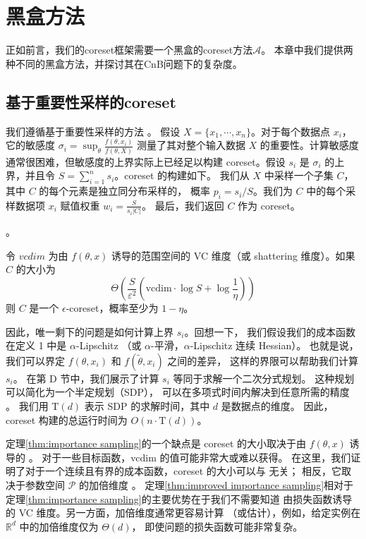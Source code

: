 \chapter{黑盒方法}

正如前言，我们的coreset框架需要一个黑盒的coreset方法$\mathcal{A}$。
本章中我们提供两种不同的黑盒方法，并探讨其在CnB问题下的复杂度。

\section{基于重要性采样的coreset}

我们遵循基于重要性采样的方法 \citep{LS10}。
假设 $X = \{x_1, \cdots, x_n\}$。对于每个数据点 $x_i$，
它的敏感度 $\sigma_i = \sup_\theta \frac{f(\theta, x_i)}{f(\theta, X)}$ 
测量了其对整个输入数据 $X$ 的重要性。计算敏感度通常很困难，但敏感度的上界实际上已经足以构建 
coreset。假设 $s_i$ 是 $\sigma_i$ 的上界，并且令 $S = \sum_{i=1}^n s_i$。coreset 的构建如下。
我们从 $X$ 中采样一个子集 $C$，其中 $C$ 的每个元素是独立同分布采样的，
概率 $p_i = s_i / S$。我们为 $C$ 中的每个采样数据项 $x_i$ 赋值权重 $w_i = \frac{S}{s_i |C|}$。
最后，我们返回 $C$ 作为 coreset。


\begin{theorem}。

令 $vcdim$ 为由 $f(\theta, x)$ 诱导的范围空间的 VC 维度（或 shattering 维度）。如果 $C$ 的大小为
\begin{equation}
\Theta \left( \frac{S}{\varepsilon^2} \left( \text{vcdim} \cdot \log S + \log \frac{1}{\eta} \right) \right)
\end{equation}
则 $C$ 是一个 $\epsilon$-coreset，概率至少为 $1 - \eta$。
\label{thm:importance sampling}
\end{theorem}

因此，唯一剩下的问题是如何计算上界 $s_i$。回想一下，
我们假设我们的成本函数在定义 1 中是 $\alpha$-Lipschitz
（或 $\alpha$-平滑，$\alpha$-Lipschitz 连续 Hessian）。
也就是说，我们可以界定 $f(\theta, x_i)$ 和 $f(\tilde{\theta}, x_i)$ 之间的差异，
这样的界限可以帮助我们计算 $s_i$。
在第 D 节中，我们展示了计算 $s_i$ 等同于求解一个二次分式规划。
这种规划可以简化为一个半定规划（SDP）\citep{BT09}，
可以在多项式时间内解决到任意所需的精度 \citep{GM12}。
我们用 $\text{T}(d)$ 表示 SDP 的求解时间，其中 $d$ 是数据点的维度。
因此，coreset 构建的总运行时间为 $O(n \cdot \text{T}(d))$。

定理\ref{thm:importance sampling}的一个缺点是 coreset 的大小取决于由 $f(\theta, x)$ 诱导的 。
对于一些目标函数，vcdim 的值可能非常大或难以获得。
在这里，我们证明了对于一个连续且有界的成本函数，coreset 的大小可以与 无关；
相反，它取决于参数空间 $\mathcal{P}$ 的加倍维度 。
定理\ref{thm:improved importance sampling}相对于定理\ref{thm:importance sampling}的主要优势在于我们不需要知道
由损失函数诱导的 VC 维度。另一方面，加倍维度通常更容易计算
（或估计），例如，给定实例在 $\mathbb{R}^d$ 中的加倍维度仅为 $\Theta(d)$，
即使问题的损失函数可能非常复杂。

